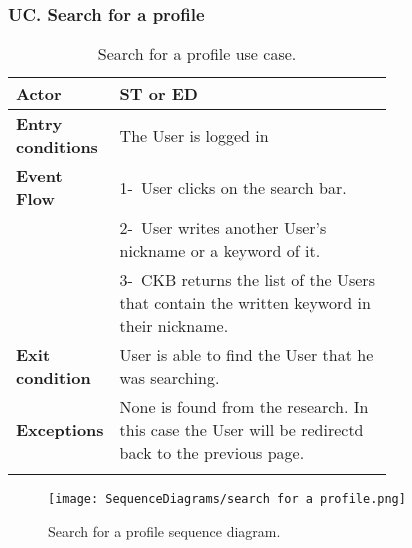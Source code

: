 \subsubsection*{UC\cuc . Search for a profile}
\begin{center}
    \begin{longtable}{|l|p{0.75\linewidth}|}
        \hline
        \textbf{Actor}            & ST or ED\\
        \hline
        \textbf{Entry conditions} & The User is logged in  \\
        \hline
        \textbf{Event Flow}       & 1-\ User clicks on the search bar.        \\
        & 2-\ User writes another User's nickname or a keyword of it. \\
        & 3-\ CKB returns the list of the Users that contain the written keyword in their nickname.         \\
        \hline
        \textbf{Exit condition}   & User is able to find the User that he was searching.        \\
        \hline
        \textbf{Exceptions}        &  None is found from the research. In this case the User will be redirectd back to the previous page.\\
        \hline
        \caption{Search for a profile use case.}
        \label{tab: search_for_a_profile_use_case}
    \end{longtable}
\end{center}

\begin{figure}[H]
    \begin{center}
        \texttt{[image: SequenceDiagrams/search for a profile.png]}
        \caption{Search for a profile sequence diagram.}
        \label{fig:search_for_a_profile_seqd}%
    \end{center}
\end{figure}

\newpage

